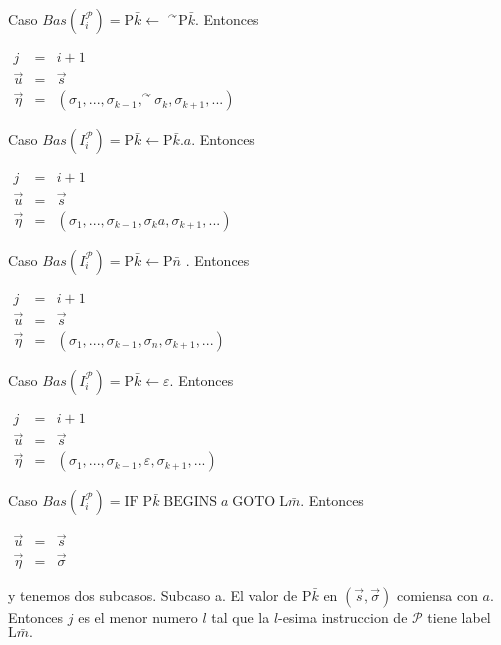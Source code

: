 Caso \(Bas(I_{i}^{\mathcal{P}})=\mathrm{P}\bar{k}\leftarrow \) \( ^{\curvearrowright }\mathrm{P}\bar{k}.\) Entonces

\(\displaystyle \begin{array}{rcl} j & =& i+1 \\ \vec{u} & =& \vec{s} \\ \vec{\eta} & =& (\sigma _{1},...,\sigma _{k-1},^{\curvearrowright }\sigma _{k},\sigma _{k+1},...) \end{array} \)

Caso \(Bas(I_{i}^{\mathcal{P}})=\mathrm{P}\bar{k}\leftarrow \mathrm{P}\bar{k} .a\). Entonces

\(\displaystyle \begin{array}{rcl} j & =& i+1 \\ \vec{u} & =& \vec{s} \\ \vec{\eta} & =& (\sigma _{1},...,\sigma _{k-1},\sigma _{k}a,\sigma _{k+1},...) \end{array} \)

Caso \(Bas(I_{i}^{\mathcal{P}})=\mathrm{P}\bar{k}\leftarrow \mathrm{P}\bar{n}\) . Entonces

\(\displaystyle \begin{array}{rcl} j & =& i+1 \\ \vec{u} & =& \vec{s} \\ \vec{\eta} & =& (\sigma _{1},...,\sigma _{k-1},\sigma _{n},\sigma _{k+1},...) \end{array} \)

Caso \(Bas(I_{i}^{\mathcal{P}})=\mathrm{P}\bar{k}\leftarrow \varepsilon .\) Entonces

\(\displaystyle \begin{array}{rcl} j & =& i+1 \\ \vec{u} & =& \vec{s} \\ \vec{\eta} & =& (\sigma _{1},...,\sigma _{k-1},\varepsilon ,\sigma _{k+1},...) \end{array} \)

Caso \(Bas(I_{i}^{\mathcal{P}})=\mathrm{IF}\;\mathrm{P}\bar{k}\;\mathrm{BEGINS }\;a\;\mathrm{GOTO}\;\mathrm{L}\bar{m}.\) Entonces

\(\displaystyle \begin{array}{rcl} \vec{u} & =& \vec{s} \\ \vec{\eta} & =& \vec{\sigma} \end{array} \)

y tenemos dos subcasos.
Subcaso a. El valor de \(\mathrm{P}\bar{k}\) en \((\vec{s},\vec{\sigma})\) comiensa con \(a\). Entonces \(j\) es el menor numero \(l\) tal que la \(l\)-esima instruccion de \(\mathcal{P}\) tiene label \(\mathrm{L}\bar{m}.\)

